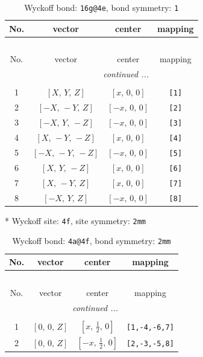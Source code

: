 \documentclass[fleqn,8pt]{jsarticle}
\begin{document}
\renewcommand{\arraystretch}{1.2}
\begin{longtable}{cccc}
\caption{Wyckoff bond: {\tt 16g@4e}, bond symmetry: {\tt 1}}
 \\
 \hline \hline
No. & vector & center & mapping \\ \hline \endfirsthead

\multicolumn{3}{l}{\tablename\ \thetable{}} \\
 \hline \hline
No. & vector & center & mapping \\ \hline \endhead

 \hline \hline
\multicolumn{3}{r}{\footnotesize\it continued ...} \\ \endfoot

 \hline \hline
\multicolumn{3}{r}{} \\ \endlastfoot

1 & $\left[ X,\, Y,\, Z \right]$ & $\left[ x,\, 0,\, 0 \right]$ & {\tt [1]} \\ \hline
2 & $\left[ - X,\, - Y,\, Z \right]$ & $\left[ - x,\, 0,\, 0 \right]$ & {\tt [2]} \\ \hline
3 & $\left[ - X,\, Y,\, - Z \right]$ & $\left[ - x,\, 0,\, 0 \right]$ & {\tt [3]} \\ \hline
4 & $\left[ X,\, - Y,\, - Z \right]$ & $\left[ x,\, 0,\, 0 \right]$ & {\tt [4]} \\ \hline
5 & $\left[ - X,\, - Y,\, - Z \right]$ & $\left[ - x,\, 0,\, 0 \right]$ & {\tt [5]} \\ \hline
6 & $\left[ X,\, Y,\, - Z \right]$ & $\left[ x,\, 0,\, 0 \right]$ & {\tt [6]} \\ \hline
7 & $\left[ X,\, - Y,\, Z \right]$ & $\left[ x,\, 0,\, 0 \right]$ & {\tt [7]} \\ \hline
8 & $\left[ - X,\, Y,\, Z \right]$ & $\left[ - x,\, 0,\, 0 \right]$ & {\tt [8]} \\
\end{longtable}
* Wyckoff site: {\tt 4f}, site symmetry: {\tt 2mm}
\renewcommand{\arraystretch}{1.2}
\begin{longtable}{cccc}
\caption{Wyckoff bond: {\tt 4a@4f}, bond symmetry: {\tt 2mm}}
 \\
 \hline \hline
No. & vector & center & mapping \\ \hline \endfirsthead

\multicolumn{3}{l}{\tablename\ \thetable{}} \\
 \hline \hline
No. & vector & center & mapping \\ \hline \endhead

 \hline \hline
\multicolumn{3}{r}{\footnotesize\it continued ...} \\ \endfoot

 \hline \hline
\multicolumn{3}{r}{} \\ \endlastfoot

1 & $\left[ 0,\, 0,\, Z \right]$ & $\left[ x,\, \frac{1}{2},\, 0 \right]$ & {\tt [1,-4,-6,7]} \\ \hline
2 & $\left[ 0,\, 0,\, Z \right]$ & $\left[ - x,\, \frac{1}{2},\, 0 \right]$ & {\tt [2,-3,-5,8]} \\
\end{longtable}
\end{document}

